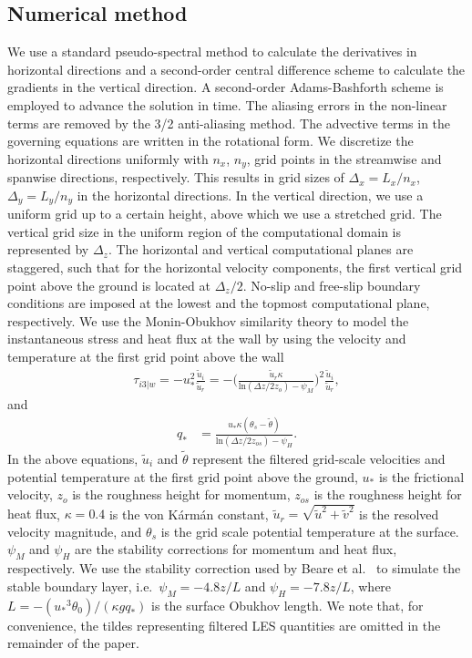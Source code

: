 \documentclass[%
 aip,
 amsmath,amssymb,
reprint,
twocolumn,%
author-numerical,%
]{revtex4-1}
\begin{document}
\subsection{Numerical method}\label{sec2.2} 
We use a standard pseudo-spectral method to calculate the derivatives in horizontal directions and a second-order central difference scheme to calculate the gradients in the vertical direction. A second-order Adams-Bashforth scheme is employed to advance the solution in time. The aliasing errors in the non-linear terms are removed by the 3/2 anti-aliasing method\cite{can88}. The advective terms in the governing equations are written in the rotational form\cite{fer02}. We discretize the horizontal directions uniformly with $n_x$, $n_y$, grid points in the streamwise and spanwise directions, respectively. This results in grid sizes of $\Delta_{x}=L_x/n_x$, $\Delta_{y}=L_y/n_y$ in the horizontal directions. {\color{black} In the vertical direction, we use a uniform grid up to a certain height, above which we use a stretched grid. The vertical grid size in the uniform region of the computational domain is represented by $\Delta_z$.} The horizontal and vertical computational planes are staggered, such that for the horizontal velocity components, the first vertical grid point above the ground is located at $\Delta_{z}/2$. No-slip and free-slip boundary conditions are imposed at the lowest and the topmost computational plane, respectively. We use the Monin-Obukhov similarity theory \cite{moe84} to model the instantaneous stress and heat flux at the wall by using the velocity and temperature at the first grid point above the wall
%
\begin{align}
\tau_{i3|w}=-{u_{*}^2}\frac{\widetilde{u}_i}{\widetilde{u}_r}=-\Bigg(\frac{\widetilde{u}_r\kappa}{\text{ln}(\Delta{z}/2z_o)-\psi_{M}}\Bigg)^2\frac{\widetilde{u}_i}{\widetilde{u}_r},\label{eqn6}
\end{align}
%
and
%
\begin{align} 
q_{*}&=\frac{u_{*}\kappa(\theta_s-\widetilde{\theta})}{\text{ln}(\Delta{z}/2z_{os})-\psi_{H}}.\label{eqn7}
\end{align}
%
\noindent In the above equations, $\widetilde{u}_i$ and $\widetilde{\theta}$ represent the filtered grid-scale velocities and potential temperature at the first grid point above the ground, $u_*$ is the frictional velocity, $z_o$ is the roughness height for momentum, {\color{black} $z_{os}$ is the roughness height for heat flux}, $\kappa=0.4$ is the von K\'arm\'an constant, $\widetilde{u}_r=\sqrt{\widetilde{u}^2 + \widetilde{v}^2}$ is the resolved velocity magnitude, and $\theta_s$ is the grid scale potential temperature at the surface. $\psi_M$ and $\psi_H$ are the stability corrections for momentum and heat flux, respectively. We use the stability correction used by Beare et al.\ \cite{bea06} to simulate the stable boundary layer, i.e.\ $\psi_{M}= -4.8z/L$ and $\psi_{H}= -7.8z/L$, where $L=-({u_*}^3\theta_{0})/({\kappa}gq_{*})$ is the surface Obukhov length. We note that, for convenience, the tildes representing filtered LES quantities are omitted in the remainder of the paper.
\end{document}
